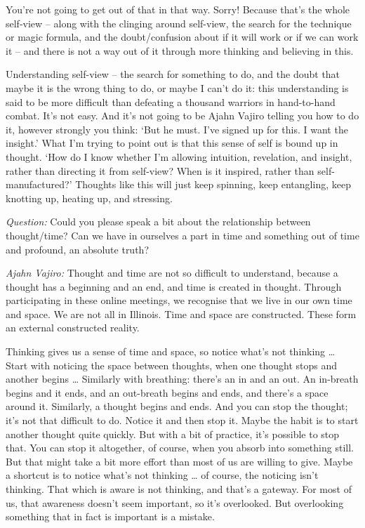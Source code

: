 You're not going to get out of that in that way. Sorry! Because that's the whole
self-view -- along with the clinging around self-view, the search for the
technique or magic formula, and the doubt/confusion about if it will work or if
we can work it -- and there is not a way out of it through more thinking and believing in this.

\enlargethispage{2\baselineskip}

Understanding self-view -- the search for something to do, and the doubt that
maybe it is the wrong thing to do, or maybe I can't do it: this understanding is
said to be more difficult than defeating a thousand warriors in hand-to-hand
combat. It's not easy. And it's not going to be Ajahn Vajiro telling you how to
do it, however strongly you think: `But he must. I've signed up for this. I want
the insight.' What I'm trying to point out is that this sense of self is
bound up in thought. `How do I know whether I'm allowing intuition, revelation,
and insight, rather than directing it from self-view? When is it inspired,
rather than self-manufactured?' Thoughts like this will just keep spinning, keep
entangling, keep knotting up, heating up, and stressing.

\clearpage

\emph{Question:} Could you please speak a bit about the relationship between
thought/time? Can we have in ourselves a part in time and something out of time
and profound, an absolute truth?

\emph{Ajahn Vajiro:} Thought and time are not so difficult to understand, because a
thought has a beginning and an end, and time is created in thought. Through
participating in these online meetings, we recognise that we live in our own
time and space. We are not all in Illinois. Time and space are constructed. These
form an external constructed reality.

Thinking gives us a sense of time and space, so notice what's not thinking
\ldots{} Start with noticing the space between thoughts, when one thought stops
and another begins \ldots{} Similarly with breathing: there's an in and an out.
An in-breath begins and it ends, and an out-breath begins and ends, and there's
a space around it. Similarly, a thought begins and ends. And you can stop the
thought; it's not that difficult to do. Notice it and then stop it. Maybe the
habit is to start another thought quite quickly. But with a bit of practice,
it's possible to stop that. You can stop it altogether, of course, when you
absorb into something still. But that might take a bit more effort than most of us are
willing to give. Maybe a shortcut is to notice what's not thinking \ldots{} of
course, the noticing isn't thinking. That which is aware is not thinking, and
that's a gateway. For most of us, that awareness doesn't seem important, so it's
overlooked. But overlooking something that in fact is important is a mistake.

